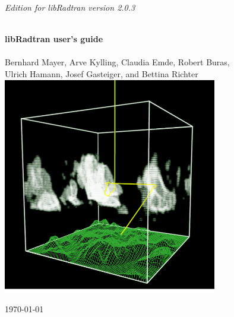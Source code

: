 \begin{titlepage}
 
\begin{center}
 
  \begin{flushright}
    {\sl \large Edition for libRadtran version 2.0.3}
  \end{flushright}
  \vspace*{2cm}
  
  \HRule \\[0.8cm]
  { \huge \bfseries libRadtran user's guide}\\[0.4cm]
  \HRule \\[1.5cm]
  
  \Large{Bernhard Mayer, Arve Kylling, Claudia Emde, Robert Buras, \\
    Ulrich Hamann, Josef Gasteiger, and Bettina Richter} \\[2cm]
  
  \includegraphics[width=0.7\textwidth]{figs/mystic2.png}\\

  \vfill
  
  {\large \today}
  
\end{center}

\end{titlepage}
